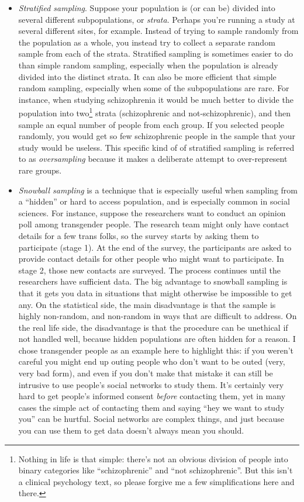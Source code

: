 \documentclass[
]{book}
\providecommand{\tightlist}{%
  \setlength{\itemsep}{0pt}\setlength{\parskip}{0pt}}
\begin{document}
\begin{itemize}
\tightlist
\item
  \emph{Stratified sampling}. Suppose your population is (or can be) divided into several different subpopulations, or \emph{strata}. Perhaps you're running a study at several different sites, for example. Instead of trying to sample randomly from the population as a whole, you instead try to collect a separate random sample from each of the strata. Stratified sampling is sometimes easier to do than simple random sampling, especially when the population is already divided into the distinct strata. It can also be more efficient that simple random sampling, especially when some of the subpopulations are rare. For instance, when studying schizophrenia it would be much better to divide the population into two\footnote{Nothing in life is that simple: there's not an obvious division of people into binary categories like ``schizophrenic'' and ``not schizophrenic''. But this isn't a clinical psychology text, so please forgive me a few simplifications here and there.} strata (schizophrenic and not-schizophrenic), and then sample an equal number of people from each group. If you selected people randomly, you would get so few schizophrenic people in the sample that your study would be useless. This specific kind of of stratified sampling is referred to as \emph{oversampling} because it makes a deliberate attempt to over-represent rare groups.
\item
  \emph{Snowball sampling} is a technique that is especially useful when sampling from a ``hidden'' or hard to access population, and is especially common in social sciences. For instance, suppose the researchers want to conduct an opinion poll among transgender people. The research team might only have contact details for a few trans folks, so the survey starts by asking them to participate (stage 1). At the end of the survey, the participants are asked to provide contact details for other people who might want to participate. In stage 2, those new contacts are surveyed. The process continues until the researchers have sufficient data. The big advantage to snowball sampling is that it gets you data in situations that might otherwise be impossible to get any. On the statistical side, the main disadvantage is that the sample is highly non-random, and non-random in ways that are difficult to address. On the real life side, the disadvantage is that the procedure can be unethical if not handled well, because hidden populations are often hidden for a reason. I chose transgender people as an example here to highlight this: if you weren't careful you might end up outing people who don't want to be outed (very, very bad form), and even if you don't make that mistake it can still be intrusive to use people's social networks to study them. It's certainly very hard to get people's informed consent \emph{before} contacting them, yet in many cases the simple act of contacting them and saying ``hey we want to study you'' can be hurtful. Social networks are complex things, and just because you can use them to get data doesn't always mean you should.

\end{itemize}
\end{document}
